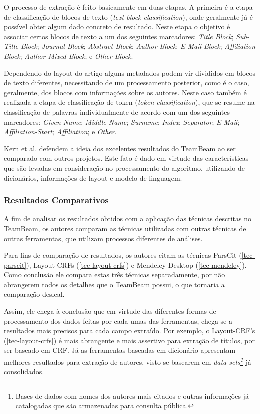 O processo de extração é feito basicamente em duas etapas. A primeira é a etapa de classificação de blocos de texto (\textit{text block classification}), onde geralmente já é possível obter algum dado concreto de resultado. Neste etapa o objetivo é associar certos blocos de texto a um dos seguintes marcadores: \textit{Title Block}; \textit{Sub-Title Block}; \textit{Journal Block}; \textit{Abstract Block}; \textit{Author Block}; \textit{E-Mail Block}; \textit{Affiliation Block}; \textit{Author-Mixed Block}; e \textit{Other Block}.

Dependendo do layout do artigo alguns metadados podem vir divididos em blocos de texto diferentes, necessitando de um processamento posterior, como é o caso, geralmente, dos blocos com informações sobre os autores. Neste caso também é realizada a etapa de classificação de token (\textit{token classification}), que se resume na classificação de palavras individualmente de acordo com um dos seguintes marcadores: \textit{Given Name}; \textit{Middle Name}; \textit{Surname}; \textit{Index}; \textit{Separator}; \textit{E-Mail}; \textit{Affiliation-Start}; \textit{Affiliation}; e \textit{Other}.

Kern et al. defendem a ideia dos excelentes resultados do TeamBeam ao ser comparado com outros projetos. Este fato é dado em virtude das características que são levadas em consideração no processamento do algoritmo, utilizando de dicionários, informações de layout e modelo de linguagem.

\subsubsection{Resultados Comparativos}

A fim de analisar os resultados obtidos com a aplicação das técnicas descritas no TeamBeam, os autores comparam as técnicas utilizadas com outras técnicas de outras ferramentas, que utilizam processos diferentes de análises.

Para fins de comparação de resultados, os autores citam as técnicas ParsCit (\autoref{tec-parscit}), Layout-CRFs (\autoref{tec-layout-crfs}) e Mendeley Desktop (\autoref{tec-mendeley}). Como conclusão ele compara estas três técnicas separadamente, por não abrangerem todos os detalhes que o TeamBeam possui, o que tornaria a comparação desleal.

Assim, ele chega à conclusão que em virtude das diferentes formas de processamento dos dados feitas por cada umas das ferramentas, chega-se a resultados mais precisos para cada campo extraído. Por exemplo, o Layout-CRF's (\autoref{tec-layout-crfs}) é mais abrangente e mais assertivo para extração de títulos, por ser baseado em CRF. Já as ferramentas baseadas em dicionário apresentam melhores resultados para extração de autores, visto se basearem em \textit{data-sets\footnote{Bases de dados com nomes dos autores mais citados e outras informações já catalogadas que são armazenadas para consulta pública.}} já consolidados.


